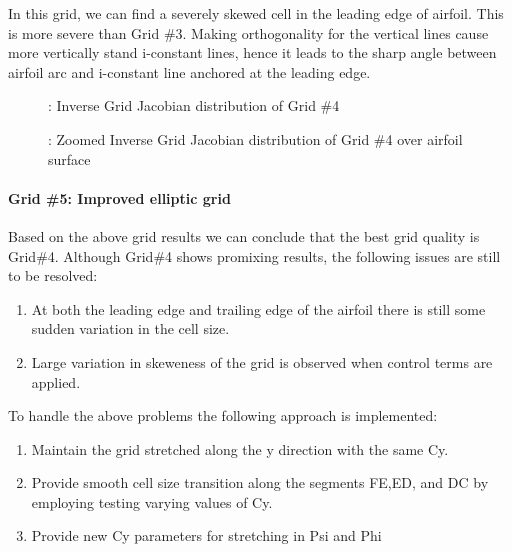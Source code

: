 \documentclass[letterpaper,10pt,english]{sphinxmanual}
\begin{document}
In this grid, we can find a severely skewed cell in the leading edge of airfoil. This is more severe than Grid \#3. Making orthogonality for the vertical lines cause more vertically stand i-constant lines, hence it leads to the sharp angle between airfoil arc and i-constant line anchored at the leading edge.
\begin{figure}[htbp]
\centering
\capstart

\noindent{}
\caption{: Inverse Grid Jacobian distribution of Grid \#4}\label{\detokenize{cases/grid_af:id8}}\end{figure}
\begin{figure}[htbp]
\centering
\capstart

\noindent{}
\caption{: Zoomed Inverse Grid Jacobian distribution of Grid \#4 over airfoil surface}\label{\detokenize{cases/grid_af:id9}}\end{figure}


\paragraph{Grid \#5: Improved elliptic grid}
\label{\detokenize{cases/grid_af:grid-5-improved-elliptic-grid}}
Based on the above grid results we can conclude that the best grid quality is Grid\#4. Although Grid\#4 shows promixing results, the following issues are still to be resolved:
\begin{enumerate}
\item {} 
At both the leading edge and trailing edge of the airfoil there is still some sudden variation in the cell size.

\item {} 
Large variation in skeweness of the grid is observed when control terms are applied.

\end{enumerate}

To handle the above problems the following approach is implemented:
\begin{enumerate}
\item {} 
Maintain the grid stretched along the y direction with the same Cy.

\item {} 
Provide smooth cell size transition along the segments FE,ED, and DC by employing testing varying values of Cy.

\item {} 
Provide new Cy parameters for stretching in Psi and Phi

\end{enumerate}
\end{document}
